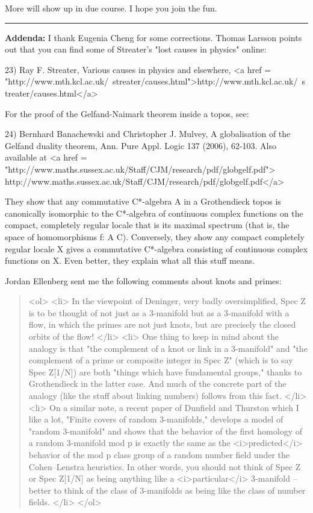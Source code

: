 More will show up in due course.  I hope you join the fun.

\par\noindent\rule{\textwidth}{0.4pt}
\textbf{Addenda:} I thank Eugenia Cheng for some corrections.
Thomas Larsson points out that you can find some of Streater's 
"lost causes in physics" online:

23) Ray F. Streater, Various causes in physics and elsewhere,
<a href = "http://www.mth.kcl.ac.uk/~streater/causes.html">http://www.mth.kcl.ac.uk/~streater/causes.html</a>

For the proof of the Gelfand-Naimark theorem inside a topos, see:

24) Bernhard Banachewski and Christopher J. Mulvey, A globalisation
of the Gelfand duality theorem, Ann. Pure Appl. Logic 137 (2006), 
62-103.  Also available at 
<a href = "http://www.maths.sussex.ac.uk/Staff/CJM/research/pdf/globgelf.pdf">
http://www.maths.sussex.ac.uk/Staff/CJM/research/pdf/globgelf.pdf</a>

They show that any commutative C*-algebra A in a Grothendieck topos is
canonically isomorphic to the C*-algebra of continuous 
complex functions on the compact, completely regular locale that is its
maximal spectrum (that is, the space of homomorphisms f: A \to  C).
Conversely, they show any compact completely regular locale X gives
a commutative C*-algebra consisting of continuous complex functions
on X.  Even better, they explain what all this stuff means.

Jordan Ellenberg sent me the following comments about knots and primes:

\begin{quote}

<ol>
<li>
In the viewpoint of Deninger, very badly
oversimplified, Spec Z is to be thought of not just as a
3-manifold but as a 3-manifold with
a flow, in which the primes are not just knots, but are precisely the
closed orbits of the flow!
</li>
<li>
One thing to keep in mind about the analogy is that "the complement of
a knot or link in a 3-manifold" and "the complement of a prime or composite
integer in Spec Z" (which is to say Spec Z[1/N])
are both "things which have fundamental groups," thanks to Grothendieck in
the latter case.  And much of the concrete part of the analogy (like the
stuff about linking numbers) follows from this
fact.
</li>
<li>
On a similar note, a recent paper of Dunfield and Thurston which
I like a lot, "Finite covers
of random 3-manifolds," develops a model of "random 3-manifold" and
shows that the behavior of the first
homology of a random 3-manifold mod p is exactly the same as the
<i>predicted</i> behavior of the mod p class group of a random number
field under the Cohen--Lenstra heuristics.  In other words, you should
not think of Spec Z or Spec Z[1/N] as being anything
like a <i>particular</i> 3-manifold -- better to think of the class of
3-manifolds as being like the class of number fields.
</li>
</ol>

\end{quote}
    

